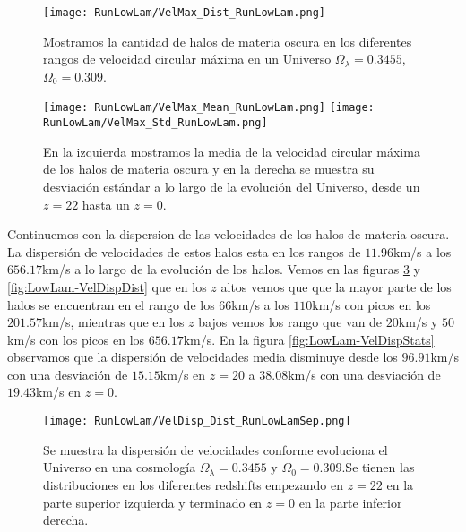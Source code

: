 \begin{figure}[H]
    \centering
    \texttt{[image: RunLowLam/VelMax\_Dist\_RunLowLam.png]}
    \caption[Distribución de la velocidad circular máxima]{\footnotesize Mostramos la cantidad de halos de materia oscura en los diferentes rangos de velocidad circular máxima en un Universo $\Omega_\lambda = 0.3455$, $\Omega_0 = 0.309$.}
    \label{fig:LowLam-VelMaxDist}
\end{figure}

\begin{figure}[H]
    \centering
    \texttt{[image: RunLowLam/VelMax\_Mean\_RunLowLam.png]}
    \texttt{[image: RunLowLam/VelMax\_Std\_RunLowLam.png]}
    \caption[Media y desviación estándar de la velocidad circular máxima]{\footnotesize En la izquierda mostramos la media de la velocidad circular máxima de los halos de materia oscura y en la derecha se muestra su desviación estándar a lo largo de la evolución del Universo, desde un $z=22$ hasta un $z=0$.}
    \label{fig:LowLam-VelMaxStats}
\end{figure}

Continuemos con la dispersion de las velocidades de los halos de materia oscura. La dispersión de velocidades de estos halos esta en los rangos de $11.96$km/s a los $656.17$km/s a lo largo de la evolución de los halos. Vemos en las figuras \ref{fig:LowLam-VelDispDistSep} y \ref{fig:LowLam-VelDispDist} que en los $z$ altos vemos que que la mayor parte de los halos se encuentran en el rango de los $66$km/s a los $110$km/s con picos en los $201.57$km/s, mientras que en los $z$ bajos vemos los rango que van de $20$km/s y $50$km/s con los picos en los $656.17$km/s. En la figura \ref{fig:LowLam-VelDispStats} observamos que la dispersión de velocidades media disminuye desde los $96.91$km/s con una desviación de $15.15$km/s en $z=20$ a $38.08$km/s con una desviación de $19.43$km/s en $z=0$.

\begin{figure}[H]
    \centering
    \texttt{[image: RunLowLam/VelDisp\_Dist\_RunLowLamSep.png]}
    \caption[Dispersión de velocidades]{\footnotesize Se muestra la dispersión de velocidades conforme evoluciona el Universo en una cosmología $\Omega_\lambda = 0.3455$ y $\Omega_0 = 0.309$.Se tienen las distribuciones en los diferentes redshifts empezando en $z=22$ en la parte superior izquierda y terminado en $z=0$ en la parte inferior derecha.}
    \label{fig:LowLam-VelDispDistSep}
\end{figure}

